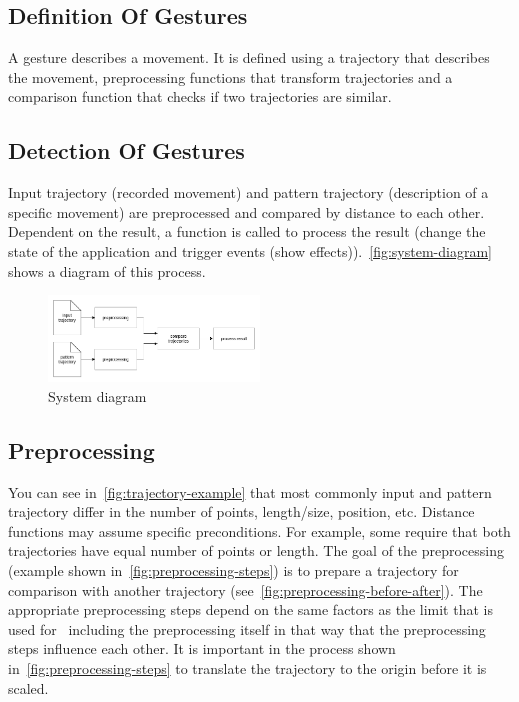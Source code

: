 \subsection{Definition Of Gestures}

A gesture describes a movement.
It is defined using a trajectory that describes the movement, preprocessing functions that transform trajectories and a comparison function that checks if two trajectories are similar.


\subsection{Detection Of Gestures}

Input trajectory (recorded movement) and pattern trajectory (description of a
specific movement) are preprocessed and compared by distance to each other.
Dependent on the result, a function is called to process the result (change the state of the application and trigger events (show effects)).~\autoref{fig:system-diagram} shows a diagram of this process.

\begin{figure}[!htbp]
    \centering
    \includegraphics[width=0.5\textwidth]{pictures/system-diagram.png}
    \caption{System diagram}
    \label{fig:system-diagram}
\end{figure}


\subsection{Preprocessing}\label{subsec:preprocessing}

You can see in~\autoref{fig:trajectory-example} that most commonly input and pattern trajectory differ in the number of points, length/size, position, etc.
Distance functions may assume specific preconditions.
For example, some require that both trajectories have equal number of points or length.
The goal of the preprocessing (example shown in~\autoref{fig:preprocessing-steps}) is to prepare a trajectory for comparison with another trajectory (see~\autoref{fig:preprocessing-before-after}).
The appropriate preprocessing steps depend on the same factors as the limit that is used for~ including the preprocessing itself in that way that the preprocessing steps influence each other.
It is important in the process shown in~\autoref{fig:preprocessing-steps} to translate the trajectory to the origin before it is scaled.


